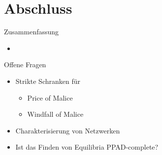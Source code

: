 \documentclass{beamer}
\begin{document}
\section{Abschluss}
\begin{frame}{Zusammenfassung}
	\begin{itemize}
		\item 
	\end{itemize}
\end{frame}

\begin{frame}{Offene Fragen}
	\begin{itemize}
		\item Strikte Schranken für 
		\begin{itemize}
			\item Price of Malice
			\item Windfall of Malice
		\end{itemize}
		\item Charakterisierung von Netzwerken
		\item Ist das Finden von Equilibria PPAD-complete?
	\end{itemize}
\end{frame}
\end{document}

